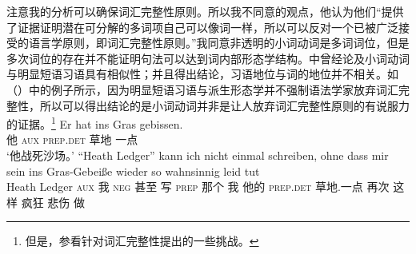 \begin{exe}
\begin{xlist}[iv.]
\begin{exe}
\begin{xlist}[iv.]
注意我的分析可以确保词汇完整性原则。所以我不同意\citet*[]{CSP2010a}的观点，他认为他们“提供了证据证明潜在可分解的多词项自己可以像词一样，所以可以反对一个已被广泛接受的语言学原则，即词汇完整性原则。”我同意非透明的小词动词是多词词位，但是多次词位的存在并不能证明句法可以达到词内部形态学结构。中曾经论及小词动词与明显短语习语具有相似性；并且得出结论，习语地位与词的地位并不相关。如（）中的例子所示，因为明显短语习语与派生形态学并不强制语法学家放弃词汇完整性，所以可以得出结论的是小词动词并非是让人放弃词汇完整性原则的有说服力的证据。\footnote{%
  但是，参看针对词汇完整性提出的一些挑战。
}
\eal
\ex
\gll Er hat ins Gras gebissen.\\
     他 \textsc{aux} \textsc{prep}.\textsc{det} 草地 一点\\
\glt `他战死沙场。'
\ex 
\gll "`Heath Ledger"' kann ich nicht einmal schreiben, ohne dass mir sein ins Gras-Gebeiße wieder so
wahnsinnig leid tut%
\footnotemark\\
    \spacebr{}Heath Ledger \textsc{aux} 我 \textsc{neg} 甚至 写 \textsc{prep} 那个 我 他的 \textsc{prep}.\textsc{det} 草地.一点 再次 这样
    疯狂 悲伤 做\\
\footnotetext{%
}
\end{xlist}
\end{exe}
\end{xlist}
\end{exe}
